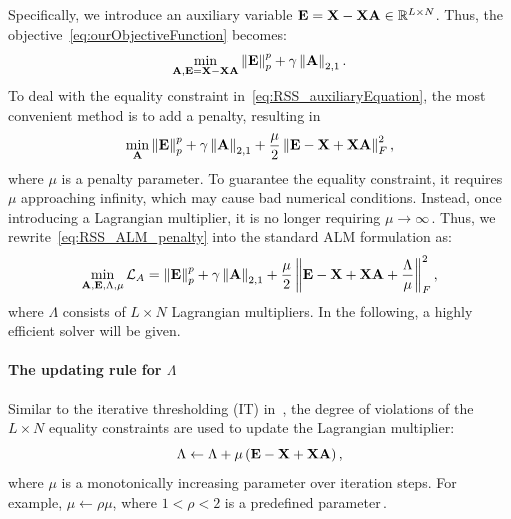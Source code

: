 \documentclass[a4paper]{article}
\begin{document}
Specifically, we introduce an auxiliary variable $\mathbf{E}=\mathbf{X}-\mathbf{X}\mathbf{A}\in\mathbb{R}^{L\times N}$.
Thus, the objective\ \eqref{eq:ourObjectiveFunction} becomes: 
\begin{equation}
\min_{\mathbf{A},\mathbf{E}=\mathbf{X}-\mathbf{X}\mathbf{A}}\left\Vert \mathbf{E}\right\Vert _{p}^{p}+\gamma\left\Vert \mathbf{A}\right\Vert _{2,1}.\label{eq:RSS_auxiliaryEquation}
\end{equation}
To deal with the equality constraint in\ \eqref{eq:RSS_auxiliaryEquation},
the most convenient method is to add a penalty, resulting in 
\begin{equation}
\min_{\mathbf{A}}\left\Vert \mathbf{E}\right\Vert _{p}^{p}+\gamma\left\Vert \mathbf{A}\right\Vert _{2,1}+\frac{\mu}{2}\left\Vert \mathbf{E}-\mathbf{X}+\mathbf{X}\mathbf{A}\right\Vert _{F}^{2},\label{eq:RSS_ALM_penalty}
\end{equation}
 where $\mu$ is a penalty parameter. To guarantee the equality constraint,
it requires $\mu$ approaching infinity, which may cause bad numerical
conditions. Instead, once introducing a Lagrangian multiplier, it
is no longer requiring $\mu\rightarrow\infty$\,\cite{cbLi_2011_PhDthesis_CSfor3D_data,Nocedal_2006_book_numericalOptimization}.
Thus, we rewrite\ \eqref{eq:RSS_ALM_penalty} into the standard ALM
formulation as:
\begin{equation}
\min_{\mathbf{A},\mathbf{E},\Lambda,\mu}\mathcal{L}_{A}=\left\Vert \mathbf{E}\right\Vert _{p}^{p}+\gamma\left\Vert \mathbf{A}\right\Vert _{2,1}+\frac{\mu}{2}\left\Vert \mathbf{E}-\mathbf{X}+\mathbf{X}\mathbf{A}+\frac{\Lambda}{\mu}\right\Vert _{F}^{2},\label{eq:RRS_ALM_both}
\end{equation}
where $\Lambda$ consists of $L\times N$ Lagrangian multipliers.
In the following, a highly efficient solver will be given. 


\paragraph{The updating rule for  $\Lambda$}

Similar to the iterative thresholding (IT) in\ \cite{JohnWright_2009_NIPS_Rpca,fpNie_2014_ICML_newSolverForSvm},
the degree of violations of the $L\!\times\! N$ equality constraints
are used to update the Lagrangian multiplier:
\begin{equation}
\Lambda\leftarrow\Lambda+\mu\left(\mathbf{E}-\mathbf{X}+\mathbf{X}\mathbf{A}\right),\label{eq:FSS_updataForMultiplier}
\end{equation}
where $\mu$ is a monotonically increasing parameter over iteration
steps. For example, $\mu\leftarrow\rho\mu$, where $1<\rho<2$ is
a predefined parameter\,\cite{Nocedal_2006_book_numericalOptimization}. 
\end{document}
